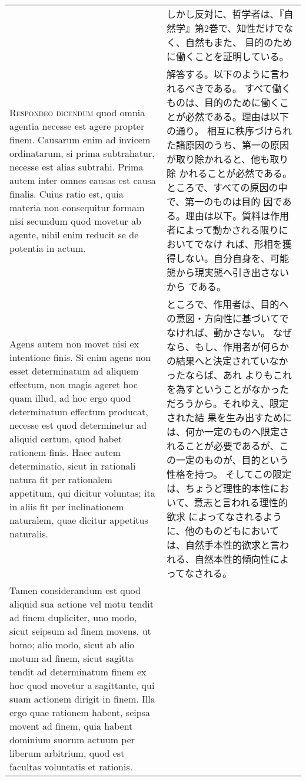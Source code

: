 \documentclass[10pt]{jsarticle} %
\begin{document}
\begin{longtable}{p{21em}p{21em}}
&

しかし反対に、哲学者は、『自然学』第2巻で、知性だけでなく、自然もまた、
 目的のために働くことを証明している。


\\


{\scshape Respondeo dicendum} quod omnia agentia
necesse est agere propter finem. Causarum enim ad invicem ordinatarum,
si prima subtrahatur, necesse est alias subtrahi. Prima autem inter
omnes causas est causa finalis. Cuius ratio est, quia materia non
consequitur formam nisi secundum quod movetur ab agente, nihil enim
reducit se de potentia in actum. 


&

解答する。以下のように言われるべきである。
すべて働くものは、目的のために働くことが必然である。理由は以下の通り。
相互に秩序づけられた諸原因のうち、第一の原因が取り除かれると、他も取り除
 かれることが必然である。ところで、すべての原因の中で、第一のものは目的
 因である。理由は以下。質料は作用者によって動かされる限りにおいてでなけ
 れば、形相を獲得しない。自分自身を、可能態から現実態へ引き出さないから
 である。



\\

Agens autem non movet nisi ex
intentione finis. Si enim agens non esset determinatum ad aliquem
effectum, non magis ageret hoc quam illud, ad hoc ergo quod determinatum
effectum producat, necesse est quod determinetur ad aliquid certum, quod
habet rationem finis. Haec autem determinatio, sicut in rationali natura
fit per rationalem appetitum, qui dicitur voluntas; ita in aliis fit per
inclinationem naturalem, quae dicitur appetitus naturalis. 


&

ところで、作用者は、目的への意図・方向性に基づいてでなければ、動かさない。
なぜなら、もし、作用者が何らかの結果へと決定されていなかったならば、あれ
 よりもこれを為すということがなかっただろうから。それゆえ、限定された結
 果を生み出すためには、何か一定のものへ限定されることが必要であるが、こ
 の一定のものが、目的という性格を持つ。
そしてこの限定は、ちょうど理性的本性において、意志と言われる理性的欲求
 によってなされるように、他のものどもにおいては、自然手本性的欲求と言わ
 れる、自然本性的傾向性によってなされる。



\\

Tamen
considerandum est quod aliquid sua actione vel motu tendit ad finem
dupliciter, uno modo, sicut seipsum ad finem movens, ut homo; alio modo,
sicut ab alio motum ad finem, sicut sagitta tendit ad determinatum finem
ex hoc quod movetur a sagittante, qui suam actionem dirigit in
finem. Illa ergo quae rationem habent, seipsa movent ad finem, quia
habent dominium suorum actuum per liberum arbitrium, quod est facultas
voluntatis et rationis. 



\end{longtable}
\end{document}

